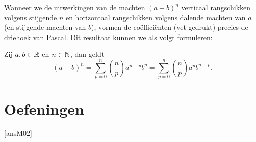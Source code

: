 \documentclass{ximera}
\begin{document}
Wanneer we de uitwerkingen van de machten $(a+b)^n$ verticaal
rangschikken volgens stijgende $n$ en horizontaal rangschikken
volgens dalende machten van $a$ (en stijgende machten van $b$),
vormen de co\"effici\"enten (vet gedrukt) precies de driehoek van
Pascal. Dit resultaat kunnen we als volgt formuleren:
\newpage\begin{observation}\normalfont\footnotemark Zij $a,b\in\mathbb{R}$ en $n\in\mathbb{N}$, dan
geldt \[(a+b)^n=\sum^n_{p=0}{n\choose
p}a^{n-p}b^p=\sum^n_{p=0}{n\choose p}a^{p}b^{n-p}.\]
\end{observation}

\section{Oefeningen}\label{M02_oef}
[ansM02]
\renewcommand{\labelenumi}{(\alph{enumi})}
\end{document}
